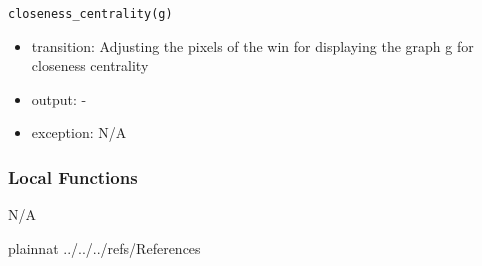 \documentclass[12pt, titlepage]{article}
\begin{document}
\noindent \texttt{closeness\_centrality(g)}
\begin{itemize}
\item transition: Adjusting the pixels of the win for displaying the graph g for closeness centrality
\item output: -
\item exception: N/A  
\end{itemize}

\subsubsection{Local Functions}

N/A

\newpage



 {plainnat}
 {../../../refs/References}
\end{document}
